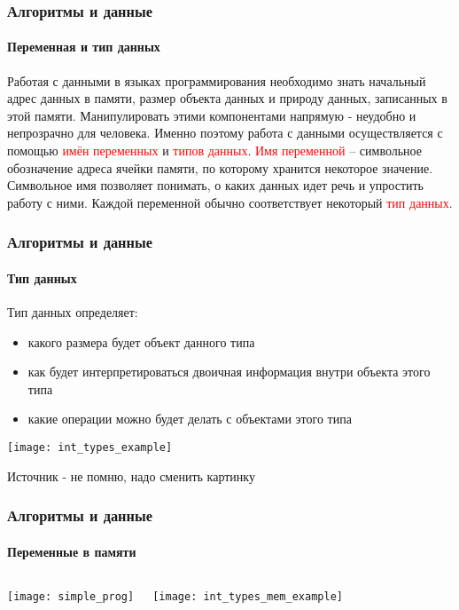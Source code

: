 \documentclass[aspectratio=169]{beamer}
\begin{document}
\begin{frame}
\frametitle{Алгоритмы и данные}
\framesubtitle{Переменная и тип данных}
\justifying
Работая с данными в языках программирования необходимо знать начальный адрес данных в памяти, размер объекта данных и природу данных, записанных в этой памяти. \newline\newline Манипулировать этими компонентами напрямую - неудобно и непрозрачно для человека. Именно поэтому работа с данными осуществляется с помощью \textcolor{red}{имён переменных} и \textcolor{red}{типов данных}.\newline\newline
\textcolor{red}{Имя переменной} – символьное обозначение адреса ячейки памяти, по которому хранится некоторое значение. Символьное имя позволяет понимать, о каких данных идет речь и упростить работу с ними.\newline\newline
Каждой переменной обычно соответствует некоторый \textcolor{red}{тип данных}.
\end{frame}

\begin{frame}
\frametitle{Алгоритмы и данные}
\framesubtitle{Тип данных}
\justifying
\small

Тип данных определяет:

\begin{itemize}
\item{какого размера будет объект данного типа}
\item{как будет интерпретироваться двоичная информация внутри объекта этого типа}
\item{какие операции можно будет делать с объектами этого типа}
\end{itemize}

\texttt{[image: int\_types\_example]}
\centering

\scriptsize Источник - не помню, надо сменить картинку
\end{frame}

\begin{frame}
\frametitle{Алгоритмы и данные}
\framesubtitle{Переменные в памяти}
\justifying
\begin{block}{}
\begin{columns}[]
\column{\dimexpr\linewidth-30mm}
\justifying
\small

\centering
\texttt{[image: simple\_prog]}
\centering

\column{30mm}

\texttt{[image: int\_types\_mem\_example]}
\centering

\end{columns}
\end{block}
\end{frame}
\end{document}
